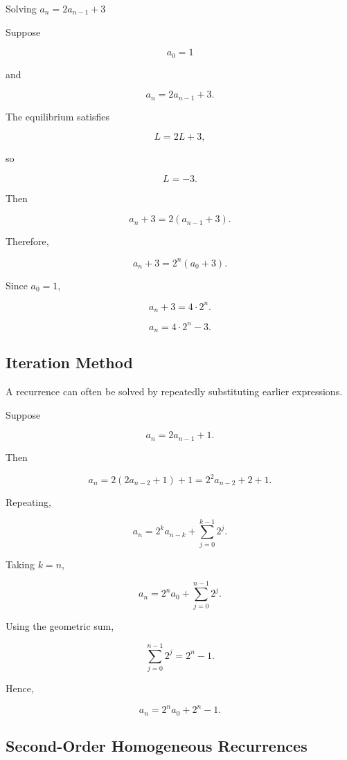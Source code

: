 \begin{workedexamplebox}{Solving \(a_n=2a_{n-1}+3\)}

Suppose

\[
a_0=1
\]

and

\[
a_n=2a_{n-1}+3.
\]

The equilibrium satisfies

\[
L=2L+3,
\]

so

\[
L=-3.
\]

Then

\[
a_n+3
=
2(a_{n-1}+3).
\]

Therefore,

\[
a_n+3
=
2^n(a_0+3).
\]

Since \(a_0=1\),

\[
a_n+3=4\cdot2^n.
\]

\begin{answerbox}
\[
\boxed{
a_n=4\cdot2^n-3.
}
\]
\end{answerbox}

\end{workedexamplebox}

\subsection{Iteration Method}
\label{subsec:iteration-method}

A recurrence can often be solved by repeatedly substituting earlier
expressions.

Suppose

\[
a_n=2a_{n-1}+1.
\]

Then

\[
a_n
=
2(2a_{n-2}+1)+1
=
2^2a_{n-2}+2+1.
\]

Repeating,

\[
a_n
=
2^ka_{n-k}
+
\sum_{j=0}^{k-1}2^j.
\]

Taking \(k=n\),

\[
a_n
=
2^na_0
+
\sum_{j=0}^{n-1}2^j.
\]

Using the geometric sum,

\[
\sum_{j=0}^{n-1}2^j
=
2^n-1.
\]

Hence,

\[
\boxed{
a_n
=
2^na_0+2^n-1.
}
\]

\subsection{Second-Order Homogeneous Recurrences}
\label{subsec:second-order-homogeneous}

